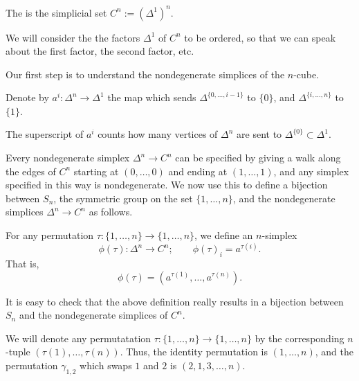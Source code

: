 \documentclass[main.tex]{subfiles}
\begin{document}
\begin{definition}
  The  is the simplicial set $C^{n} := (\Delta^{1})^{n}$.
\end{definition}

\begin{note}
  We will consider the the factors $\Delta^{1}$ of $C^{n}$ to be ordered, so that we can speak about the first factor, the second factor, etc.
\end{note}

Our first step is to understand the nondegenerate simplices of the $n$-cube.

\begin{definition}
  Denote by $a^{i}\colon \Delta^{n} \to \Delta^{1}$ the map which sends $\Delta^{\{0, \ldots, i-1\}}$ to $\{0\}$, and $\Delta^{\{i, \ldots, n\}}$ to $\{1\}$.
\end{definition}

\begin{note}
  The superscript of $a^{i}$ counts how many vertices of $\Delta^{n}$ are sent to $\Delta^{\{0\}} \subset \Delta^{1}$.
\end{note}

Every nondegenerate simplex $\Delta^{n} \to C^{n}$ can be specified by giving a walk along the edges of $C^{n}$ starting at $(0, \ldots, 0)$ and ending at $(1, \ldots, 1)$, and any simplex specified in this way is nondegenerate. We now use this to define a bijection between $S_{n}$, the symmetric group on the set $\{1, \ldots, n\}$, and the nondegenerate simplices $\Delta^{n} \to C^{n}$ as follows.

\begin{definition}
  For any permutation $\tau\colon \{1, \ldots, n\} \to \{1, \ldots, n\}$, we define an $n$-simplex
  \begin{equation*}
    \phi(\tau)\colon \Delta^{n} \to C^{n};\qquad \phi(\tau)_{i} = a^{\tau(i)}.
  \end{equation*}
  That is,
  \begin{equation*}
    \phi(\tau) = (a^{\tau(1)}, \ldots, a^{\tau(n)}).
  \end{equation*}
\end{definition}

\begin{note}
  It is easy to check that the above definition really results in a bijection between $S_{n}$ and the nondegenerate simplices of $C^{n}$.
\end{note}

\begin{notation}
  We will denote any permutatation $\tau\colon \{1, \ldots, n\} \to \{1, \ldots, n\}$ by the corresponding $n$-tuple $(\tau(1), \ldots, \tau(n))$. Thus, the identity permutation is $(1, \ldots, n)$, and the permutation $\gamma_{1,2}$ which swaps $1$ and $2$ is $(2, 1, 3, \ldots, n)$.
\end{notation}
\end{document}
